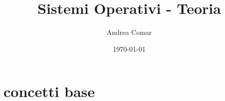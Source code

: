 \documentclass{article}
\title{Sistemi Operativi - Teoria}
\author{Andrea Comar}
\date{\today}
\begin{document}

\maketitle
\newpage
\tableofcontents
\newpage

\part{concetti base}
\end{document}
